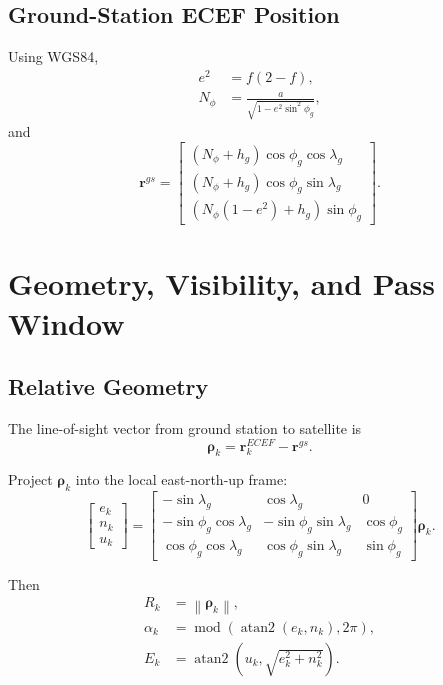 \documentclass[11pt]{article}
\newcommand{\vect}[1]{\mathbf{#1}}
\newcommand{\norm}[1]{\left\lVert #1 \right\rVert}
\newcommand{\atanTwo}{\operatorname{atan2}}
\begin{document}
\subsection{Ground-Station ECEF Position}

Using WGS84,
\begin{align}
  e^2 &= f(2-f), \\
  N_\phi &= \frac{a}{\sqrt{1 - e^2 \sin^2 \phi_g}},
\end{align}
and
\begin{equation}
  \vect{r}^{gs}
  =
  \begin{bmatrix}
    (N_\phi + h_g)\cos \phi_g \cos \lambda_g \\
    (N_\phi + h_g)\cos \phi_g \sin \lambda_g \\
    (N_\phi(1-e^2) + h_g)\sin \phi_g
  \end{bmatrix}.
\end{equation}

\section{Geometry, Visibility, and Pass Window}

\subsection{Relative Geometry}

The line-of-sight vector from ground station to satellite is
\begin{equation}
  \vect{\rho}_k = \vect{r}^{ECEF}_k - \vect{r}^{gs}.
\end{equation}

Project $\vect{\rho}_k$ into the local east-north-up frame:
\begin{equation}
  \begin{bmatrix}
    e_k \\ n_k \\ u_k
  \end{bmatrix}
  =
  \begin{bmatrix}
    -\sin \lambda_g & \cos \lambda_g & 0 \\
    -\sin \phi_g \cos \lambda_g & -\sin \phi_g \sin \lambda_g & \cos \phi_g \\
    \cos \phi_g \cos \lambda_g & \cos \phi_g \sin \lambda_g & \sin \phi_g
  \end{bmatrix}
  \vect{\rho}_k.
\end{equation}

Then
\begin{align}
  R_k &= \norm{\vect{\rho}_k}, \\
  \alpha_k &= \operatorname{mod}\left(\atanTwo(e_k, n_k), 2\pi \right), \\
  E_k &= \atanTwo\left(u_k, \sqrt{e_k^2+n_k^2} \right).
\end{align}
\end{document}
